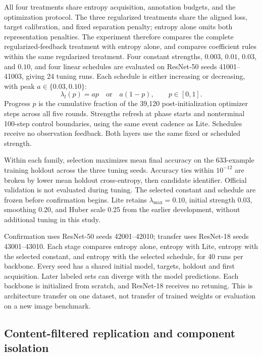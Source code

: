 \documentclass[10pt,a4paper,twocolumn]{article}
\begin{document}
All four treatments share entropy acquisition, annotation budgets,
and the optimization protocol. The three regularized treatments share
the aligned loss, target calibration, and fixed separation penalty;
entropy alone omits both representation penalties. The experiment
therefore compares the complete regularized-feedback treatment with
entropy alone, and compares coefficient rules within the same
regularized treatment.
Four constant strengths, $0.003$, $0.01$, $0.03$, and $0.10$, and four
linear schedules are evaluated on ResNet-50 seeds 41001--41003, giving
24 tuning runs. Each schedule is either increasing or decreasing,
with peak $a\in\{0.03,0.10\}$:
\begin{equation}
 \lambda_l(p)=ap\quad\text{or}\quad a(1-p),\qquad p\in[0,1].
 \label{eq:openloop_schedule}
\end{equation}
Progress $p$ is the cumulative fraction of the 39,120
post-initialization optimizer steps across all five rounds. Strengths
refresh at phase starts and nonterminal 100-step control boundaries,
using the same event cadence as Lite. Schedules receive no observation
feedback. Both layers use the same fixed or scheduled strength.

Within each family, selection maximizes mean final accuracy on the
633-example training holdout across the three tuning seeds. Accuracy
ties within $10^{-12}$ are broken by lower mean holdout cross-entropy,
then candidate identifier. Official validation is not evaluated during
tuning. The selected constant and schedule are frozen before
confirmation begins. Lite retains $\lambda_{\max}=0.10$, initial
strength 0.03, smoothing 0.20, and Huber scale 0.25 from the earlier
development, without additional tuning in this study.

Confirmation uses ResNet-50 seeds 42001--42010; transfer uses ResNet-18
seeds 43001--43010. Each stage compares entropy alone, entropy with
Lite, entropy with the selected constant, and entropy with the selected
schedule, for 40 runs per backbone. Every seed has a shared initial
model, targets, holdout and first acquisition. Later labeled sets can
diverge with the model predictions. Each backbone is initialized from
scratch, and ResNet-18 receives no retuning. This is architecture
transfer on one dataset, not transfer of trained weights or evaluation
on a new image benchmark.

\subsection{Content-filtered replication and component isolation}
\label{sec:solidification_design}
\end{document}
